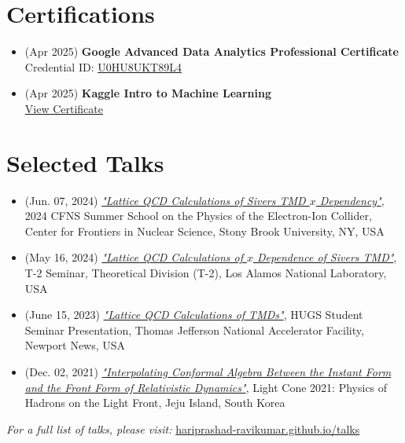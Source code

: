 \documentclass[11pt]{article}
\begin{document}
\section*{Certifications}
\vspace{-0.3em}
\begin{itemize}
    \item (Apr 2025) \textbf{Google Advanced Data Analytics Professional Certificate} \\
    Credential ID: \href{https://www.coursera.org/account/accomplishments/professional-cert/certificate/U0HU8UKT89L4}{U0HU8UKT89L4} 
    \item (Apr 2025) \textbf{Kaggle Intro to Machine Learning} \\
    \href{https://www.kaggle.com/learn/certification/hariprashadravikumar/intro-to-machine-learning}{View Certificate} 
\end{itemize}

\section*{Selected Talks}
\vspace{-0.3em}
\begin{itemize}
    \item (Jun. 07, 2024) \href{https://indico.cfnssbu.physics.sunysb.edu/event/111/contributions/1001/attachments/335/552/Lattice_QCD_calculations_of_Sivers_TMD_x_dependance____CFNS_school_presentation_Hari__NMSU_Jun_07_2024.pdf}{\textit{"Lattice QCD Calculations of Sivers TMD $x$ Dependency"}}, 2024 CFNS Summer School on the Physics of the Electron-Ion Collider, Center for Frontiers in Nuclear Science, Stony Brook University, NY, USA
    
    \item (May 16, 2024) \href{https://hariprashad-ravikumar.github.io/talks/Lattice_QCD_calculations_of_Sivers_TMD_x_dependance____presentation_Hari__NMSU_May_16_2024.pdf}{\textit{"Lattice QCD Calculations of $x$ Dependence of Sivers TMD"}}, T-2 Seminar, Theoretical Division (T-2), Los Alamos National Laboratory, USA
    
    \item (June 15, 2023) \href{https://indico.jlab.org/event/717/contributions/12720/attachments/9865/14525/Lattice_QCD_calculations_of_TMDs_HUGS_presentation_Hari_NMSU_Jun_15_2023__updated_%20(1).pdf}{\textit{"Lattice QCD Calculations of TMDs"}}, HUGS Student Seminar Presentation, Thomas Jefferson National Accelerator Facility, Newport News, USA
   
    \item (Dec. 02, 2021) \href{https://indico.global/event/13145/contributions/116043/}{\textit{"Interpolating Conformal Algebra Between the Instant Form and the Front Form of Relativistic Dynamics"}}, Light Cone 2021: Physics of Hadrons on the Light Front, Jeju Island, South Korea
\end{itemize}
\noindent\textit{For a full list of talks, please visit:} \href{https://hariprashad-ravikumar.github.io/talks}{hariprashad-ravikumar.github.io/talks}
\end{document}
